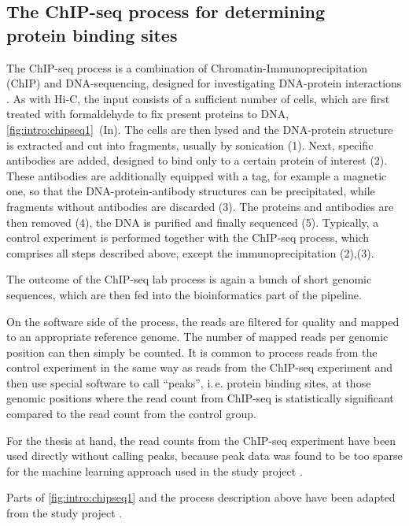 \subsection[The ChIP-seq process for determining protein binding sites]{The ChIP-seq process for determining\\protein binding sites} \label{sec:intro:chipseq}
The ChIP-seq process is a combination of Chromatin-Immu\-no\-pre\-ci\-pi\-ta\-tion (ChIP) and DNA-sequencing, 
designed for investigating DNA-protein interactions \cite{Johnson2007,Robertson2007}.
As with Hi-C, the input consists of a sufficient number of cells, which are first treated with formaldehyde
to fix present proteins to DNA, \cref{fig:intro:chipseq1}~(In).
The cells are then lysed and the DNA-protein structure is extracted and cut into fragments, 
usually by sonication (1).
Next, specific antibodies are added, designed to bind only to a certain protein of interest (2).
These antibodies are additionally equipped with a tag, for example a magnetic one, so that 
the DNA-protein-antibody structures can be precipitated, while fragments without antibodies are discarded (3).
The proteins and antibodies are then removed (4), 
the DNA is purified and finally sequenced (5).
Typically, a control experiment is performed together with the ChIP-seq process, 
which comprises all steps described above, except the immunoprecipitation (2),(3).

The outcome of the ChIP-seq lab process is again a bunch of short genomic sequences, 
which are then fed into the bioinformatics part of the pipeline.

On the software side of the process, the reads are filtered for quality and mapped to an appropriate reference genome.
The number of mapped reads per genomic position can then simply be counted.
It is common to process reads from the control experiment in the same way as reads from the ChIP-seq experiment
and then use special software to call ``peaks'', i.\,e. protein binding sites,
at those genomic positions where the read count from ChIP-seq
is statistically significant compared to the read count from the control group.

For the thesis at hand, the read counts from the ChIP-seq experiment have been used directly without calling peaks,
because peak data was found to be too sparse for the machine learning approach used 
in the study project \cite{Krauth2020}.

Parts of \cref{fig:intro:chipseq1} and the process description above have been
adapted from the study project \cite{Krauth2020}.

